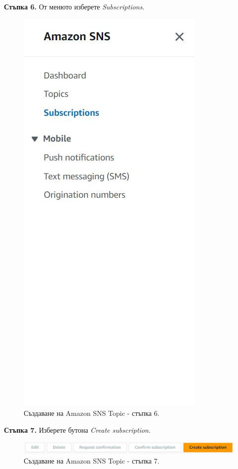 \documentclass[12pt]{article}
\begin{document}
\noindent\textbf{Стъпка 6.} От менюто изберете \textit{Subscriptions}.
\begin{figure}[h!]
\centering
    \includegraphics[scale=0.5]{instructions/sns/6.JPG}
  \caption{Създаване на Amazon SNS Topic - стъпка 6.}
\end{figure}

\noindent\textbf{Стъпка 7.} Изберете бутона \textit{Create subscription}.
\begin{figure}[h!]
\centering
    \includegraphics[scale=0.55]{instructions/sns/7.JPG}
  \caption{Създаване на Amazon SNS Topic - стъпка 7.}
\end{figure}
\end{document}
